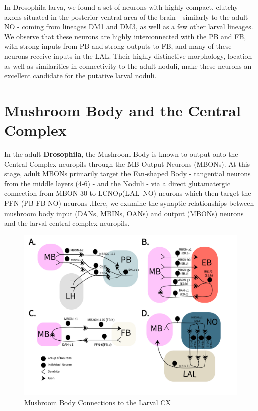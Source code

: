     In Drosophila larva, we found a set of neurons with highly compact, clutchy axons situated in the posterior ventral area of the brain - similarly to the adult NO - coming from lineages DM1 and DM3, as well as a few other larval lineages. We observe that these neurons are highly interconnected with the PB and FB,  with strong inputs from 
    PB and strong outputs to FB, and many of these neurons receive inputs in the LAL.
    Their highly distinctive morphology, location as well as similarities in connectivity to the adult noduli, make these neurons an excellent candidate for the putative larval noduli.




\section{Mushroom Body and the Central Complex}
    In the adult \textbf{Drosophila}, the Mushroom Body is known to output onto the Central Complex neuropils through the MB Output Neurons (MBONs). At this stage, adult MBONs primarily target the Fan-shaped Body - tangential neurons from the middle layers (4-6) - and the Noduli - via a direct glutamatergic connection from MBON-30 to LCNOp(LAL–NO) neurons which then target the PFN (PB-FB-NO) neurons \citep{hulse2021connectome}.Here, we examine the synaptic relationships between mushroom body input (DANs, MBINs, OANs) and output (MBONs) neurons and the larval central complex neuropils. 
        
    \begin{figure}
        \centering
        \includegraphics[width=17cm]{Figs/CX/MBtoCX.pdf}
        \caption[Mushroom Body Connections to the Larval CX]{Mushroom Body Connections to the Larval CX}
        \label{MBtoCX}
    \end{figure}

